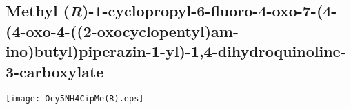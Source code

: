%
%

%
%
%
\subsection{Methyl (\textit{R})\hyp{}1\hyp{}cyclopropyl\hyp{}6\hyp{}fluoro\hyp{}4\hyp{}oxo\hyp{}7\hyp{}(4\hyp{}(4\hyp{}oxo\hyp{}4\hyp{}((2\hyp{}oxocyclopentyl)am\hyp{}ino)butyl)piperazin\hyp{}1\hyp{}yl)\hyp{}1,4\hyp{}dihydroquinoline\hyp{}3\hyp{}carboxylate }


\begin{scheme}[H]
	\begin{center}
		\texttt{[image: Ocy5NH4CipMe(R).eps]}
	\end{center}
\end{scheme}

